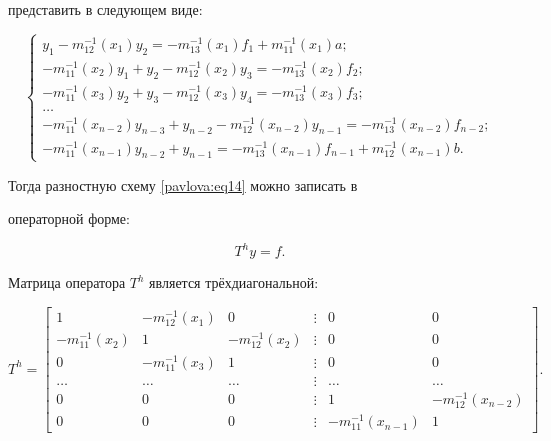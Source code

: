 представить в следующем виде:

\[

\begin{cases}

y_1 -m_{12}^{-1} (x_1)y_2 =-m_{13}^{-1} (x_1)f_1 +m_{11}^{-1} (x_1 )a; \\

-m_{11}^{-1} (x_2 )y_1 +y_2 -m_{12}^{-1} (x_2 )y_3 =-m_{13}^{-1} (x_2 )f_2; \\

-m_{11}^{-1} (x_3 )y_2 +y_3 -m_{12}^{-1} (x_3) y_4 =-m_{13}^{-1} (x_3 )f_3; \\

\ldots \\

 -m_{11}^{-1} (x_{n-2} )y_{n-3} +y_{n-2} -m_{12}^{-1} (x_{n-2} )y_{n-1}

=-m_{13}^{-1} (x_{n-2} )f_{n-2} ; \\

 -m_{11}^{-1} (x_{n-1} )y_{n-2} +y_{n-1} =-m_{13}^{-1} (x_{n-1} )f_{n-1}

+m_{12}^{-1} (x_{n-1} )b.

\end{cases}

\]

Тогда разностную схему \eqref{pavlova:eq14} можно записать в

операторной форме:

\[

T^hy=f.

\]



Матрица  оператора $T^{h}$ является трёхдиагональной:

\[

T^h=\begin{bmatrix}

1 & -m_{12}^{-1} (x_1 ) & 0                  & \vdots & 0 & 0 \\

-m_{11}^{-1} (x_2) & 1 & -m_{12}^{-1} (x_2 ) & \vdots & 0 & 0  \\

0  & -m_{11}^{-1} (x_3)& 1                   & \vdots & 0 & 0 \\

\ldots & \ldots & \ldots                     & \vdots & \ldots & \ldots \\

0 & 0     & 0 								 & \vdots & 1  & -m_{12}^{-1} (x_{n-2}) \\

0 & 0  & 0 									 & \vdots & -m_{11}^{-1} (x_{n-1}) & 1

\end{bmatrix}.

\]

